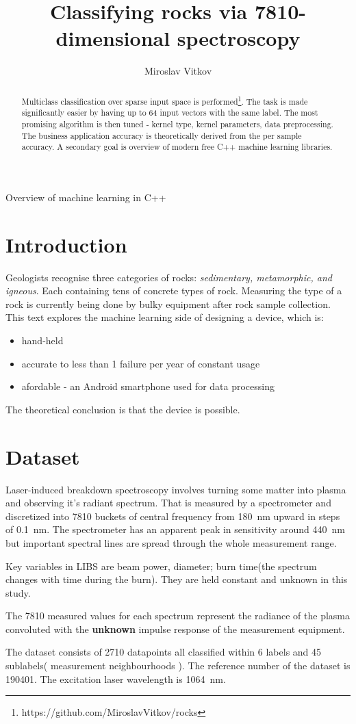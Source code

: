 \documentclass{article}
\title{Classifying rocks via 7810-dimensional spectroscopy}
\author{Miroslav Vitkov}
\begin{document}
\maketitle

Overview of machine learning in C++
\begin{abstract}
Multiclass classification over sparse input space is performed\footnote{https://github.com/MiroslavVitkov/rocks}.
The task is made significantly easier by having up to 64 input vectors with the same label.
The most promising algorithm is then tuned - kernel type, kernel parameters, data preprocessing.
The business application accuracy is theoretically derived from the per sample accuracy.
A secondary goal is overview of modern free C++ machine learning libraries.
\end{abstract}


\section{Introduction}
Geologists recognise three categories of rocks: \textit{sedimentary, metamorphic, and igneous}.
Each containing tens of concrete types of rock.
Measuring the type of a rock is currently being done by bulky equipment after rock sample collection.
This text explores the machine learning side of designing a device, which is:
\begin{itemize}
\item{hand-held}
\item{accurate to less than 1 failure per year of constant usage}
\item{afordable - an Android smartphone used for data processing}
\end{itemize}
The theoretical conclusion is that the device is possible.


\section{Dataset}
Laser-induced breakdown spectroscopy\cite{libs_intro} involves turning some matter into plasma and observing it's radiant spectrum.
That is measured by a spectrometer and discretized into 7810 buckets of central frequency from  \SI{180}{\nano\metre} upward in steps of \SI{0.1}{\nano\metre}.
The spectrometer has an apparent peak in sensitivity around \SI{440}{\nano\metre} but important spectral lines are spread through the whole measurement range.
\par
Key variables in LIBS are beam power, diameter; burn time(the spectrum changes with time during the burn).
They are held constant and unknown in this study.
\par
The 7810 measured values for each spectrum represent the radiance\cite{radiance} of the plasma convoluted with the \textbf{unknown} impulse response of the measurement equipment.
\par
The dataset consists of 2710 datapoints all classified within 6 labels and 45 sublabels( measurement neighbourhoods ).
The reference number of the dataset is 190401.
The excitation laser wavelength is \SI{1064}{\nano\metre}.
\end{document}
